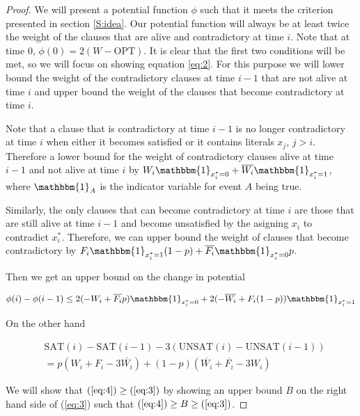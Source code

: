 \documentclass[11pt,letter]{article}
\numberwithin{theorem}{section}
\begin{document}
\begin{proof}
We will present a potential function $\phi$ such that it meets the criterion presented in section \ref{S:idea}. Our potential function will always
 be at least twice the weight of the clauses that are alive and contradictory at time $i$. Note that at time $0$,
 $\phi(0) = 2(W-\textrm{OPT})$. It is clear that the first two conditions will be met, so we will focus on showing equation \ref{eq:2}.
 For this purpose we will lower bound the weight of the contradictory clauses at time $i-1$ that are not alive at time $i$
 and upper bound the weight of the clauses that become contradictory at time $i$.

Note that a clause that is contradictory at time $i-1$ is no longer contradictory at time $i$ when either it becomes satisfied
or it contains literals $x_j$, $j > i$. Therefore a lower bound for the weight of contradictory clauses alive at time $i-1$ and
 not alive at time $i$ by $W_i \mathbbm{1}_{x_i^* = 0} + \overline{W_i} \mathbbm{1}_{x_i^* = 1}$, where $\mathbbm{1}_A$ is the indicator variable for event $A$ being true.

Similarly, the only clauses that can become contradictory at time $i$ are those that are still alive at time $i-1$ and become unsatisfied
 by the asigning $x_i$ to contradict $x_i^*$. Therefore, we can upper bound the weight of clauses that become contradictory by
 $F_i \mathbbm{1}_{x_i^* = 1} (1-p) + \overline{F_i} \mathbbm{1}_{x_i^* = 0}p$.

Then we get an upper bound on the change in potential

\begin{equation}
\label{eq:3}
\phi(i) - \phi(i-1) \leq 2(-W_i + \overline{F_i} p) \mathbbm{1}_{x_i^* = 0} + 2(-\overline{W_i} + F_i(1-p))\mathbbm{1}_{x_i^* = 1}
\end{equation}

On the other hand

\begin{equation}
\begin{aligned}
\label{eq:4}
& \textrm{SAT}(i) - \textrm{SAT}(i-1) - 3(\textrm{UNSAT}(i) - \textrm{UNSAT}(i-1)) \\
& = p(W_i + F_i - 3\overline{W_i}) + (1-p)(\overline{W_i} + \overline{F_i} - 3W_i)
\end{aligned}
\end{equation}

We will show that $(\ref{eq:4}) \geq (\ref{eq:3})$ by showing an upper bound $B$ on the right hand side of (\ref{eq:3}) such that $(\ref{eq:4}) \geq B \geq (\ref{eq:3})$.


\end{proof}
\end{document}
